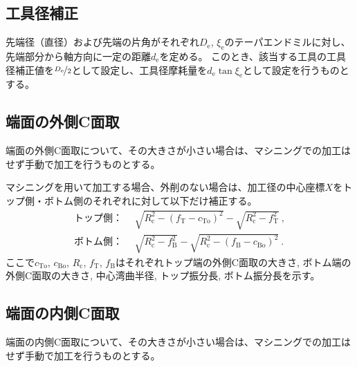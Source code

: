 \subsection{工具径補正}
先端径（直径）および先端の片角がそれぞれ$D_\mathrm e$, $\xi_\mathrm e$のテーパエンドミルに対し、先端部分から軸方向に一定の距離$d_\mathrm e$を定める。
このとき、該当する工具の工具径補正値を$\nicefrac{D_\mathrm e}2$として設定し、工具径摩耗量を$d_\mathrm e\tan\xi_\mathrm e$として設定を行うものとする。


\subsection{端面の外側C面取}
端面の外側C面取について、その大きさが小さい場合は、マシニングでの加工はせず手動で加工を行うものとする。

マシニングを用いて加工する場合、外削のない場合は、加工径の中心座標$X$をトップ側・ボトム側のそれぞれに対して以下だけ補正する。
\begin{align*}
  \text{トップ側：}&~~
  \sqrt{R_\mathrm c^2-\left(f_\mathrm T-c_\mathrm{To}\right)^2}-\sqrt{R_\mathrm c^2-f_\mathrm T^2}\ ,\\
  \text{ボトム側：}&~~
  \sqrt{R_\mathrm c^2-f_\mathrm B^2}-\sqrt{R_\mathrm c^2-\left(f_\mathrm B-c_\mathrm{Bo}\right)^2}\ .
\end{align*}
ここで$c_\mathrm{To}$, $c_\mathrm{Bo}$, $R_\mathrm c$, $f_\mathrm T$, $f_\mathrm B$はそれぞれトップ端の外側C面取の大きさ, ボトム端の外側C面取の大きさ, 中心湾曲半径, トップ振分長, ボトム振分長を示す。


\subsection{端面の内側C面取}
端面の内側C面取について、その大きさが小さい場合は、マシニングでの加工はせず手動で加工を行うものとする。

